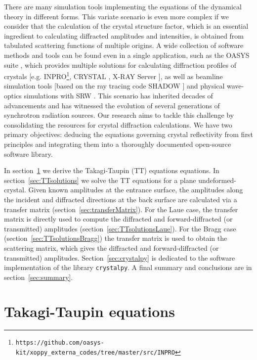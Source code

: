 \documentclass[preprint]{iucr}              %
\begin{document}
There are many simulation tools implementing the equations of the dynamical theory in different forms. This variate scenario is even more complex if we consider that the calculation of the crystal structure factor, which is an essential ingredient to calculating diffracted amplitudes and intensities, is obtained from tabulated scattering functions of multiple origins. A wide collection of software methods and tools can be found even in a single application, such as the OASYS suite \cite{codeOASYS}, which provides multiple solutions for calculating diffraction profiles of crystals [e.g. INPRO\footnote{\texttt{https://github.com/oasys-kit/xoppy\_externa\_codes/tree/master/src/INPRO}}, CRYSTAL \cite{codeCRYSTAL}, X-RAY Server \cite{codeXRAYserver}], as well as beamline simulation tools [based on the ray tracing code SHADOW \cite{codeSHADOW}] and physical wave-optics simulations with SRW \cite{codeSRW, codeSRWcrystals}.
This scenario has inherited decades of advancements and has witnessed the evolution of several generations of synchrotron radiation sources.
Our research aims to tackle this challenge by consolidating the resources for crystal diffraction calculations. We have two primary objectives: deducing the equations governing crystal reflectivity from first principles and integrating them into a thoroughly documented open-source software library.

In section~\ref{sec:TT} we derive the Takagi-Taupin (TT) equations \cite{Takagi1962, Taupin, Taupin1967} equations.
In section~\ref{sec:TTsolutions} we solve the TT equations for a plane undeformed-crystal.
Given known amplitudes at the entrance surface, the amplitudes along the incident and diffracted directions at the back surface are calculated via a transfer matrix (section~\ref{sec:transferMatrix}). For the Laue case, the transfer matrix is directly used to compute the diffracted and forward-diffracted (or transmitted) amplitudes (section~\ref{sec:TTsolutionsLaue}). For the Bragg case (section~\ref{sec:TTsolutionsBragg}) the transfer matrix is used to obtain the scattering matrix, which gives the diffracted and forward-diffracted (or transmitted) amplitudes. 
Section~\ref{sec:crystalpy} is dedicated to the software implementation of the library \texttt{crystalpy}. A final summary and conclusions are in section~\ref{sec:summary}.
 
%
\section{Takagi-Taupin equations}
\label{sec:TT}
\end{document}
